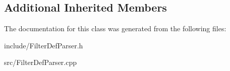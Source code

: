 \subsection*{Additional Inherited Members}


The documentation for this class was generated from the following files\+:\begin{DoxyCompactItemize}
\item 
include/Filter\+Def\+Parser.\+h\item 
src/Filter\+Def\+Parser.\+cpp\end{DoxyCompactItemize}
